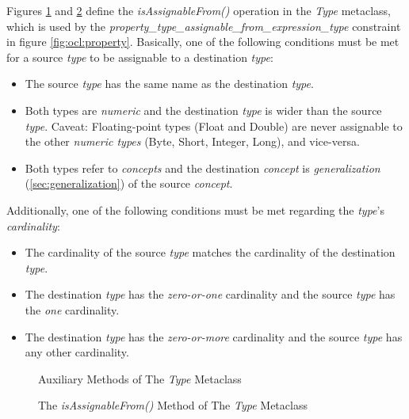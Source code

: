 \begin{constraints}
Figures \ref{fig:ocl:type_a} and \ref{fig:ocl:type_b} define the \emph{isAssignableFrom()}
operation in the \emph{Type} metaclass,
which is used by the \emph{property\_type\_assignable\_from\_expression\_type}
constraint in figure \ref{fig:ocl:property}.
Basically, one of the following conditions must be met for a source \emph{type}
to be assignable to a destination \emph{type}:

\begin{itemize}

\item The source \emph{type} has the same name as the destination \emph{type}.

\item Both types are \emph{numeric} and the destination \emph{type} is wider than the source \emph{type}.
Caveat: Floating-point types (Float and Double) are never assignable to the other \emph{numeric types}
(Byte, Short, Integer, Long), and vice-versa.

\item Both types refer to \emph{concepts} and the destination \emph{concept}
is \emph{generalization} (\ref{sec:generalization}) of the source \emph{concept}.

\end{itemize}

Additionally, one of the following conditions must be met regarding the \emph{type}'s \emph{cardinality}:

\begin{itemize}

\item The cardinality of the source \emph{type} matches the cardinality of the destination \emph{type}.

\item The destination \emph{type} has the \emph{zero-or-one} cardinality and the source \emph{type} has the \emph{one} cardinality.

\item The destination \emph{type} has the \emph{zero-or-more} cardinality and the source \emph{type} has any other cardinality.

\end{itemize}

\end{constraints}

\begin{figure}

\caption{Auxiliary Methods of The \emph{Type} Metaclass}
\label{fig:ocl:type_a}
\end{figure}

\begin{figure}

\caption{The \emph{isAssignableFrom()} Method of The \emph{Type} Metaclass}
\label{fig:ocl:type_b}
\end{figure}
